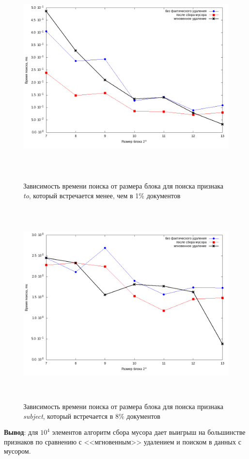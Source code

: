 \begin{figure}[H]
\includegraphics[width=\linewidth, height=10.5cm]{fig/limit_1e6/1e4/to.png}
\caption{Зависимость времени поиска от размера блока для поиска признака \textit{to}, который встречается менее, чем в 1\% документов}
\includegraphics[width=\linewidth, height=10.5cm]{fig/limit_1e6/1e4/subject.png}
\caption{Зависимость времени поиска от размера блока для поиска признака \textit{subject}, который встречается в 8\% документов}
\end{figure}

\textbf{Вывод}: для $10^4$ элементов алгоритм сбора мусора дает выигрыш на большинстве признаков
по сравнению с <<мгновенным>> удалением и поиском в данных с мусором.


